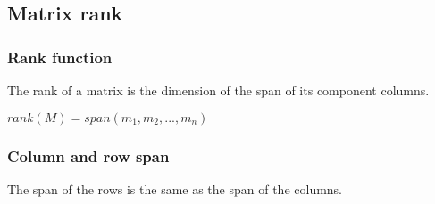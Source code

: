 

\subsection{Matrix rank}
\subsubsection{Rank function}

The rank of a matrix is the dimension of the span of its component columns.

\(rank (M)=span(m_1,m_2,...,m_n)\)

\subsubsection{Column and row span}

The span of the rows is the same as the span of the columns.



